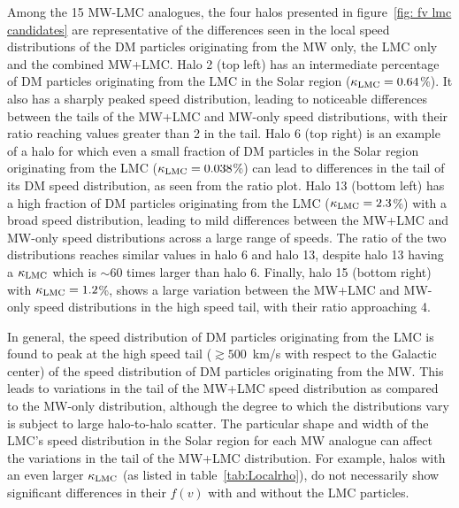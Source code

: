 Among the 15 MW-LMC analogues, the four halos presented in figure~\ref{fig: fv lmc candidates} are representative of the differences seen in the local speed distributions of the DM particles originating from the MW only, the LMC only and the combined MW+LMC. Halo 2 (top left) has an intermediate percentage of DM particles originating from the LMC in the Solar region ($\kappa_{\rm LMC}=0.64$\%). It also has a sharply peaked speed distribution, leading to noticeable differences between the tails of the MW+LMC and MW-only speed distributions, with their ratio reaching values greater than 2 in the tail. Halo 6  (top right) is an example of a halo for which even a small fraction of DM particles in the Solar region originating from the LMC  ($\kappa_{\rm LMC}=0.038$\%) can lead to   differences in the tail of its DM speed distribution, as seen from the ratio plot. Halo 13 (bottom left) has a high  fraction of DM particles originating from the LMC ($\kappa_{\rm LMC}=2.3$\%) with a broad speed distribution, leading to  mild differences  between the MW+LMC and MW-only speed distributions  across a large range of speeds. The ratio of the two distributions reaches similar values in halo 6 and halo 13, despite halo 13 having a $\kappa_{\rm LMC}$ which is $\sim 60$ times larger than halo 6. Finally, halo 15 (bottom right) with $\kappa_{\rm LMC}=1.2$\%, 
shows a large variation  between the MW+LMC and MW-only speed distributions in the high speed tail, with their ratio approaching 4. 



In general, the speed distribution of DM particles originating from the LMC is found to peak at the high speed tail ($\gtrsim 500$~km/s with respect to the Galactic center) of the speed distribution of DM particles originating from the MW. This leads to variations in the tail of the MW+LMC speed distribution as compared to the MW-only distribution, although the degree to which the distributions vary is subject to large halo-to-halo scatter. The particular shape and width of the LMC's speed distribution in the Solar region for each MW analogue can  affect the variations in the tail of the MW+LMC distribution. For example, halos with an even larger $\kappa_{\rm LMC}$ (as listed in table~\ref{tab:Localrho}), do not necessarily show significant differences in their $f(v)$ with and without the LMC particles. 






